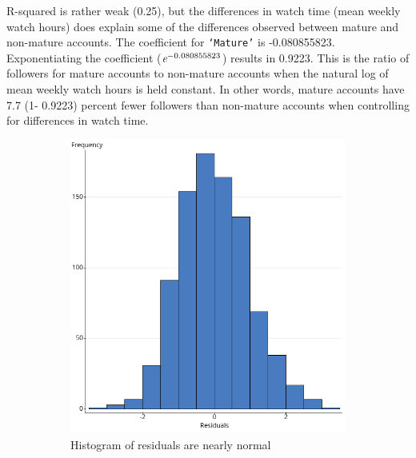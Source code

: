 \documentclass[12pt]{article}
\begin{document}
R-squared is rather weak (0.25), but the differences in watch time (mean weekly watch hours) does explain some of the differences observed between mature and non-mature accounts. The coefficient for \texttt{`Mature'} is -0.080855823. Exponentiating the coefficient ($\emph{e}^{-0.080855823}$) results in 0.9223. This is the ratio of followers for mature accounts to non-mature accounts when the natural log of mean weekly watch hours is held constant. In other words, mature accounts have 7.7 (1- 0.9223) percent fewer followers than non-mature accounts when controlling for differences in watch time.

\begin{figure}
    \centering
    \begin{subfigure}{0.45\textwidth}
        \centering
        \includegraphics[width=\textwidth]{../StatCrunch_Results/followers_mature_watch_hrs/residual_histogram}
        \caption{Histogram of residuals are nearly normal}
        \label{fig:plot1}
    \end{subfigure}
    \hfill
    \begin{subfigure}{0.45\textwidth}
        \centering

\end{subfigure}
\end{figure}
\end{document}
